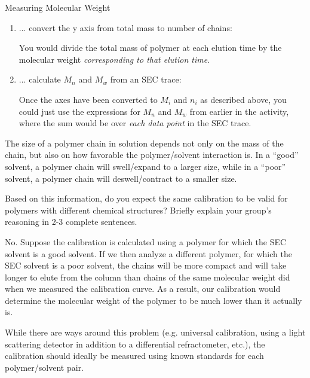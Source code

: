 \begin{activity}{Measuring Molecular Weight}
\begin{ctqs}
\begin{enumerate}
\begin{solution}[1in]
				\end{solution}
			
			\item ... convert the y axis from total mass to number of chains:
	
				\begin{solution}[1in]
					You would divide the total mass of polymer at each elution time by the molecular weight \emph{corresponding to that elution time}.
				\end{solution}
			
			\item ... calculate $M_n$ and $M_w$ from an SEC trace:
	
				\begin{solution}[1.5in]
					Once the axes have been converted to $M_i$ and $n_i$ as described above, you could just use the expressions for $M_n$ and $M_w$ from earlier in the activity, where the sum would be over \emph{each data point} in the SEC trace.
				\end{solution}
		
		\end{enumerate}
	
	\clearpage
	\question The size of a polymer chain in solution depends not only on the mass of the chain, but also on how favorable the polymer/solvent interaction is.  In a ``good'' solvent, a polymer chain will swell/expand to a larger size, while in a ``poor'' solvent, a polymer chain will deswell/contract to a smaller size.
	
		Based on this information, do you expect the same calibration to be valid for polymers with different chemical structures?  Briefly explain your group's reasoning in 2-3 complete sentences.		
	
			\begin{solution}[1.5in]
				No.  Suppose the calibration is calculated using a polymer for which the SEC solvent is a good solvent.  If we then analyze a different polymer, for which the SEC solvent is a poor solvent, the chains will be more compact and will take longer to elute from the column than chains of the same molecular weight did when we measured the calibration curve.  As a result, our calibration would determine the molecular weight of the polymer to be much lower than it actually is.
				
				While there are ways around this problem (e.g. universal calibration, using a light scattering detector in addition to a differential refractometer, etc.), the calibration should ideally be measured using known standards for each polymer/solvent pair.
			\end{solution}
	

\end{ctqs}
\end{activity}
